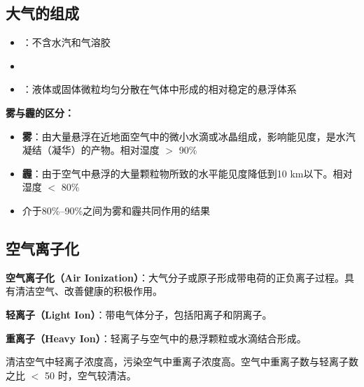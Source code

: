 \documentclass[10pt,a4paper,oneside]{ctexbook}
\begin{document}
\subsection{大气的组成}

\begin{itemize}[leftmargin=*]
    \item {}：不含水汽和气溶胶
    \item {}
    \item {}：液体或固体微粒均匀分散在气体中形成的相对稳定的悬浮体系
\end{itemize}

\begin{defbox}
\textbf{雾与霾的区分：}
\begin{itemize}[leftmargin=*]
    \item \textbf{雾}：由大量悬浮在近地面空气中的微小水滴或冰晶组成，影响能见度，是水汽凝结（凝华）的产物。相对湿度 $>$ 90\%
    \item \textbf{霾}：由于空气中悬浮的大量颗粒物所致的水平能见度降低到10 km以下。相对湿度 $<$ 80\%
    \item 介于80\%--90\%之间为雾和霾共同作用的结果
\end{itemize}
\end{defbox}

\subsection{空气离子化}

\begin{defbox}
\textbf{空气离子化（Air Ionization）}：大气分子或原子形成带电荷的正负离子过程。具有清洁空气、改善健康的积极作用。

\textbf{轻离子（Light Ion）}：带电气体分子，包括阳离子和阴离子。

\textbf{重离子（Heavy Ion）}：轻离子与空气中的悬浮颗粒或水滴结合形成。

清洁空气中轻离子浓度高，污染空气中重离子浓度高。空气中重离子数与轻离子数之比 $<$ 50 时，空气较清洁。
\end{defbox}
\end{document}
